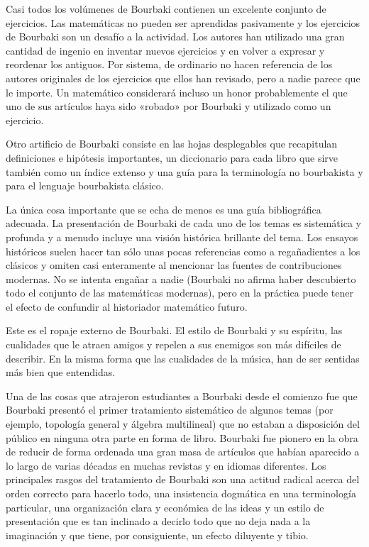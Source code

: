 \documentclass[a4paper, 12pt]{article}
\begin{document}
Casi todos los volúmenes de Bourbaki contienen un excelente 
conjunto de ejercicios. Las matemáticas no pueden ser aprendidas 
pasivamente y los ejercicios de Bourbaki son un desafío a la actividad. 
Los autores han utilizado una gran cantidad de ingenio en inventar nuevos 
ejercicios y en volver a expresar y reordenar los antiguos. Por sistema, de 
ordinario no hacen referencia de los autores originales de los ejercicios 
que ellos han revisado, pero a nadie parece que le importe. Un 
matemático considerará incluso un honor probablemente el que uno de 
sus artículos haya sido «robado» por Bourbaki y utilizado como un 
ejercicio. 




Otro artificio de Bourbaki consiste en las hojas desplegables que 
recapitulan definiciones e hipótesis importantes, un diccionario para 
cada libro que sirve también como un índice extenso y una guía 
para la terminología no bourbakista y para el lenguaje bourbakista 
clásico. 

La única cosa importante que se echa de menos es una guía 
bibliográfica adecuada. La presentación de Bourbaki de cada uno de 
los temas es sistemática y profunda y a menudo incluye una visión 
histórica brillante del tema. Los ensayos históricos suelen hacer 
tan sólo unas pocas referencias como a regañadientes a los 
clásicos y omiten casi enteramente al mencionar las fuentes de 
contribuciones modernas. No se intenta engañar a nadie (Bourbaki no 
afirma haber descubierto todo el conjunto de las matemáticas modernas), 
pero en la práctica puede tener el efecto de confundir al historiador 
matemático futuro. 

Este es el ropaje externo de Bourbaki. El estilo de Bourbaki y su 
espíritu, las cualidades que le atraen amigos y repelen a sus enemigos 
son más difíciles de describir. En la misma forma que las 
cualidades de la música, han de ser sentidas más bien que 
entendidas. 

 Una de las cosas que atrajeron estudiantes a Bourbaki desde el comienzo 
fue que Bourbaki presentó el primer tratamiento sistemático de 
algunos temas (por ejemplo, topología general y álgebra 
multilineal) que no estaban a disposición del público en ninguna 
otra parte en forma de libro. Bourbaki fue pionero en la obra de reducir de 
forma ordenada una gran masa de artículos que habían aparecido a 
lo largo de varias décadas en muchas revistas y en idiomas diferentes. 
Los principales rasgos del tratamiento de Bourbaki son una actitud radical 
acerca del orden correcto para hacerlo todo, una insistencia dogmática 
en una terminología particular, una organización clara y 
económica de las ideas y un estilo de presentación que es tan 
inclinado a decirlo todo que no deja nada a la imaginación y que tiene, 
por consiguiente, un efecto diluyente y tibio. 
\end{document}
